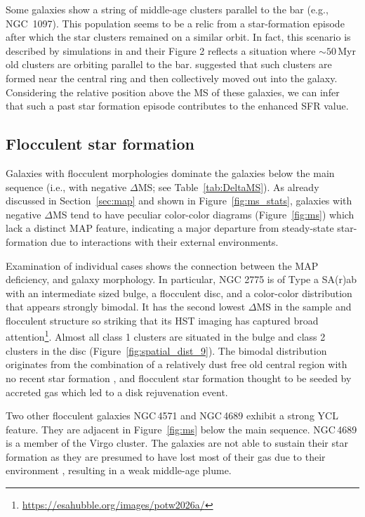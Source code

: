\documentclass[]{aastex631}
\begin{document}
Some galaxies show a string of middle-age clusters parallel to the bar (e.g., NGC~1097). This population seems to be a relic from a star-formation episode after which the star clusters remained on a similar orbit. In fact, this scenario is described by simulations in \citet{dobbs_age_2010} and their Figure 2 reflects a situation where $\sim50$\,Myr old clusters are orbiting parallel to the bar. \citet{sormani_simulations_2020} suggested that such clusters are formed near the central ring and then collectively moved out into the galaxy. Considering the relative position above the MS of these galaxies, we can infer that such a past star formation episode contributes to the enhanced SFR value.


\subsection{Flocculent star formation} \label{sect:flocculent}


Galaxies with flocculent morphologies dominate the galaxies below the main sequence (i.e., with negative $\Delta$MS; see Table~\ref{tab:DeltaMS}). As already discussed in Section~\ref{sec:map} and shown in Figure~\ref{fig:ms_stats}, galaxies with negative $\Delta$MS tend to have peculiar color-color diagrams (Figure~\ref{fig:ms}) which lack a distinct MAP feature, indicating a major departure from steady-state star-formation due to interactions with their external environments. 

Examination of individual cases shows the connection between the MAP deficiency, and galaxy morphology. In particular, NGC 2775 is of Type a SA(r)ab with an intermediate sized bulge, a flocculent disc, and a color-color distribution that appears strongly bimodal.  It has the second lowest $\Delta$MS in the sample and flocculent structure so striking that its HST imaging has captured broad attention\footnote{\url{https://esahubble.org/images/potw2026a/}}. Almost all class 1 clusters are situated in the bulge and class 2 clusters in the disc (Figure~\ref{fig:spatial_dist_9}). The bimodal distribution originates from the combination of a relatively dust free old central region with no recent star formation \citep{hogg_hot_2001}, and flocculent star formation thought to be seeded by accreted gas \citep[i.e., from the nearby companion NGC\,2777,][]{arp_properties_1991} which led to a disk rejuvenation event. 

Two other flocculent galaxies NGC\,4571 \citep{kennicutt_evolution_1983} and NGC\,4689 \citep{elmegreen_arm_2002} exhibit a strong YCL feature. They are adjacent in Figure~\ref{fig:ms} below the main sequence.  NGC\,4689 is a member of the Virgo cluster. The galaxies are not able to sustain their star formation as they are presumed to have lost most of their gas due to their environment \citep{kenney_co_1986}, resulting in a weak middle-age plume.
\end{document}

